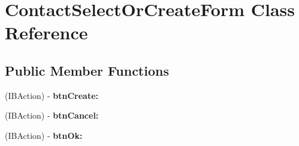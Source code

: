 \hypertarget{interface_contact_select_or_create_form}{
\section{ContactSelectOrCreateForm Class Reference}
\label{interface_contact_select_or_create_form}
}
\subsection*{Public Member Functions}
\begin{DoxyCompactItemize}
\item 
\hypertarget{interface_contact_select_or_create_form_af26040c0fabf4fcfdfbf5e46b6ec79d8}{
(IBAction) -\/ {\bfseries btnCreate:}}
\label{interface_contact_select_or_create_form_af26040c0fabf4fcfdfbf5e46b6ec79d8}

\item 
\hypertarget{interface_contact_select_or_create_form_ab0f4a74fc985a3e4b1c009dacb428e21}{
(IBAction) -\/ {\bfseries btnCancel:}}
\label{interface_contact_select_or_create_form_ab0f4a74fc985a3e4b1c009dacb428e21}

\item 
\hypertarget{interface_contact_select_or_create_form_a620154d434121fd343af481f2aabbce1}{
(IBAction) -\/ {\bfseries btnOk:}}
\label{interface_contact_select_or_create_form_a620154d434121fd343af481f2aabbce1}

\end{DoxyCompactItemize}

